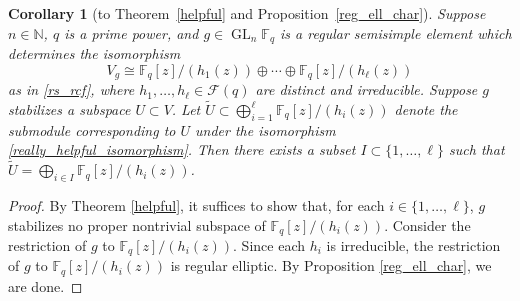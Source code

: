 \documentclass[10pt]{article}
\newtheorem{corollary}[theorem]{Corollary}
\theoremstyle{definition}
\DeclareMathOperator{\GL}{GL}
\newcommand{\F}{\mathbb{F}}
\newcommand{\CF}{\mathcal{F}}
\newcommand{\N}{\mathbb{N}}
\begin{document}
\begin{corollary}[to Theorem~\ref{helpful} and Proposition~\ref{reg_ell_char}]
\label{really_helpful}
Suppose \(n \in \N\), \(q\) is a prime power, and \(g \in \GL_n \F_q\) is a regular semisimple element which determines the isomorphism
\begin{equation}
\label{really_helpful_isomorphism}
V_g
\cong
\F_q[z] / (h_1 (z)) \oplus \cdots \oplus \F_q[z] / (h_\ell (z))
\end{equation}
as in \eqref{rs_rcf}, where $h_1,\ldots,h_\ell \in \CF(q)$ are distinct and irreducible.
Suppose $g$ stabilizes a subspace $U \subset V$.
Let \(\widetilde{U} \subset \bigoplus_{i=1}^{\ell} \F_q[z] / (h_i(z))\) denote the submodule corresponding to \(U\) under the isomorphism \eqref{really_helpful_isomorphism}.
Then there exists a subset \(I \subset \{1,\ldots,\ell\}\) such that \(\widetilde{U} = \bigoplus_{i \in I} \F_q[z]/(h_i(z))\).
\end{corollary}

\begin{proof}
By Theorem \ref{helpful}, it suffices to show that, for each \(i \in \{1,\ldots,\ell\}\), \(g\) stabilizes no proper nontrivial subspace of $\F_q[z]/(h_i(z))$.
Consider the restriction of \(g\) to \(\F_q[z]/(h_i(z))\).
Since each $h_i$ is irreducible, the restriction of $g$ to $\F_q[z] / (h_i(z))$ is regular elliptic. By Proposition \ref{reg_ell_char}, we are done.
\end{proof}
\end{document}
